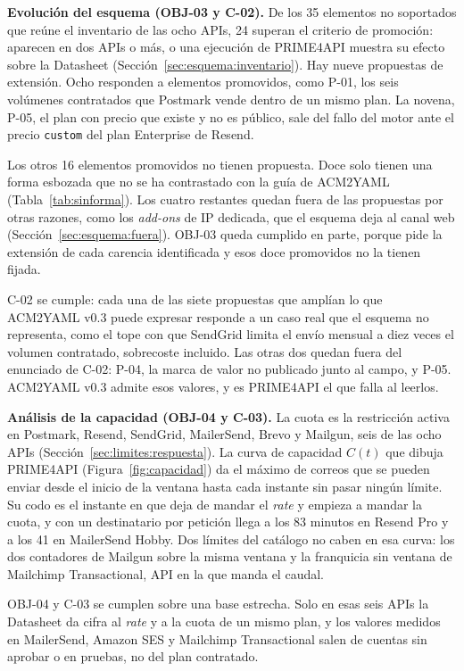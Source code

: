 \textbf{Evolución del esquema (OBJ-03 y C-02).}
De los 35 elementos no soportados que reúne el inventario de las ocho APIs, 24 superan el criterio de promoción: aparecen en dos APIs o más, o una ejecución de PRIME4API muestra su efecto sobre la Datasheet (Sección~\ref{sec:esquema:inventario}).
Hay nueve propuestas de extensión.
Ocho responden a elementos promovidos, como P-01, los seis volúmenes contratados que Postmark vende dentro de un mismo plan.
La novena, P-05, el plan con precio que existe y no es público, sale del fallo del motor ante el precio \texttt{custom} del plan Enterprise de Resend.

Los otros 16 elementos promovidos no tienen propuesta.
Doce solo tienen una forma esbozada que no se ha contrastado con la guía de ACM2YAML (Tabla~\ref{tab:sinforma}).
Los cuatro restantes quedan fuera de las propuestas por otras razones, como los \textit{add-ons} de IP dedicada, que el esquema deja al canal web (Sección~\ref{sec:esquema:fuera}).
OBJ-03 queda cumplido en parte, porque pide la extensión de cada carencia identificada y esos doce promovidos no la tienen fijada.

C-02 se cumple: cada una de las siete propuestas que amplían lo que ACM2YAML v0.3 puede expresar responde a un caso real que el esquema no representa, como el tope con que SendGrid limita el envío mensual a diez veces el volumen contratado, sobrecoste incluido.
Las otras dos quedan fuera del enunciado de C-02: P-04, la marca de valor no publicado junto al campo, y P-05.
ACM2YAML v0.3 admite esos valores, y es PRIME4API el que falla al leerlos.

\textbf{Análisis de la capacidad (OBJ-04 y C-03).}
La cuota es la restricción activa en Postmark, Resend, SendGrid, MailerSend, Brevo y Mailgun, seis de las ocho APIs (Sección~\ref{sec:limites:respuesta}).
La curva de capacidad $C(t)$ que dibuja PRIME4API (Figura~\ref{fig:capacidad}) da el máximo de correos que se pueden enviar desde el inicio de la ventana hasta cada instante sin pasar ningún límite.
Su codo es el instante en que deja de mandar el \textit{rate} y empieza a mandar la cuota, y con un destinatario por petición llega a los 83 minutos en Resend Pro y a los 41 en MailerSend Hobby.
Dos límites del catálogo no caben en esa curva: los dos contadores de Mailgun sobre la misma ventana y la franquicia sin ventana de Mailchimp Transactional, API en la que manda el caudal.

OBJ-04 y C-03 se cumplen sobre una base estrecha.
Solo en esas seis APIs la Datasheet da cifra al \textit{rate} y a la cuota de un mismo plan, y los valores medidos en MailerSend, Amazon SES y Mailchimp Transactional salen de cuentas sin aprobar o en pruebas, no del plan contratado.

